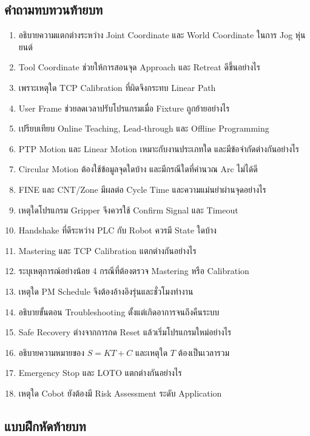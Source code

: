 \subsection{คำถามทบทวนท้ายบท}

\begin{enumerate}
    \item อธิบายความแตกต่างระหว่าง Joint Coordinate และ World Coordinate ในการ Jog หุ่นยนต์
    \item Tool Coordinate ช่วยให้การสอนจุด Approach และ Retreat ดีขึ้นอย่างไร
    \item เพราะเหตุใด TCP Calibration ที่ผิดจึงกระทบ Linear Path
    \item User Frame ช่วยลดเวลาปรับโปรแกรมเมื่อ Fixture ถูกย้ายอย่างไร
    \item เปรียบเทียบ Online Teaching, Lead-through และ Offline Programming
    \item PTP Motion และ Linear Motion เหมาะกับงานประเภทใด และมีข้อจำกัดต่างกันอย่างไร
    \item Circular Motion ต้องใช้ข้อมูลจุดใดบ้าง และมีกรณีใดที่คำนวณ Arc ไม่ได้ดี
    \item FINE และ CNT/Zone มีผลต่อ Cycle Time และความแม่นยำผ่านจุดอย่างไร
    \item เหตุใดโปรแกรม Gripper จึงควรใช้ Confirm Signal และ Timeout
    \item Handshake ที่ดีระหว่าง PLC กับ Robot ควรมี State ใดบ้าง
    \item Mastering และ TCP Calibration แตกต่างกันอย่างไร
    \item ระบุเหตุการณ์อย่างน้อย 4 กรณีที่ต้องตรวจ Mastering หรือ Calibration
    \item เหตุใด PM Schedule จึงต้องอ้างอิงรุ่นและชั่วโมงทำงาน
    \item อธิบายขั้นตอน Troubleshooting ตั้งแต่เกิดอาการจนถึงคืนระบบ
    \item Safe Recovery ต่างจากการกด Reset แล้วเริ่มโปรแกรมใหม่อย่างไร
    \item อธิบายความหมายของ $S=KT+C$ และเหตุใด $T$ ต้องเป็นเวลารวม
    \item Emergency Stop และ LOTO แตกต่างกันอย่างไร
    \item เหตุใด Cobot ยังต้องมี Risk Assessment ระดับ Application
\end{enumerate}

\newpage

\subsection{แบบฝึกหัดท้ายบท}

